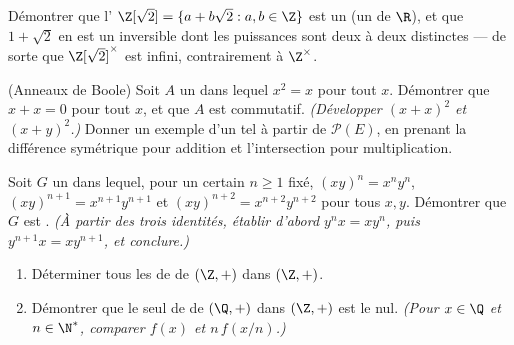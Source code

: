 \begin{exercise}[$\star\star$]\label{exo:b1:structures:9}
Démontrer que l' $\Z[\sqrt 2] = \{a + b\sqrt 2 : a, b \in \Z\}$
est un  (un  de $\R$), et que $1 + \sqrt 2$ en est un
inversible dont les puissances sont deux à deux distinctes --- de sorte
que $\Z[\sqrt 2]^\times$ est infini, contrairement à $\Z^\times$.
\end{exercise}

\begin{exercise}[$\star\star\star$]\label{exo:b1:structures:10}
(Anneaux de Boole) Soit $A$ un  dans lequel $x^2 = x$ pour tout
$x$. Démontrer que $x + x = 0$ pour tout $x$, et que $A$ est commutatif.
\emph{(Développer $(x+x)^2$ et $(x+y)^2$.)} Donner un exemple d'un tel
 à partir de $\mathcal{P}(E)$, en prenant la différence symétrique
pour addition et l'intersection pour multiplication.
\end{exercise}

\begin{exercise}[$\star\star\star$]\label{exo:b1:structures:11}
Soit $G$ un  dans lequel, pour un certain $n \geq 1$ fixé,
$(xy)^n = x^n y^n$, $(xy)^{n+1} = x^{n+1}y^{n+1}$ et $(xy)^{n+2} =
x^{n+2}y^{n+2}$ pour tous $x, y$. Démontrer que $G$ est .
\emph{(À partir des trois identités, établir d'abord $y^n x = x y^n$,
puis $y^{n+1} x = x y^{n+1}$, et conclure.)}
\end{exercise}

\begin{exercise}[$\star\star$]\label{exo:b1:structures:12}
\begin{enumerate}
  \item Déterminer tous les  de  de $(\Z, +)$ dans
        $(\Z, +)$.
  \item Démontrer que le seul  de  de $(\Q, +)$ dans
        $(\Z, +)$ est le  nul. \emph{(Pour $x \in \Q$ et
        $n \in \N^*$, comparer $f(x)$ et $n\,f(x/n)$.)}
\end{enumerate}
\end{exercise}

